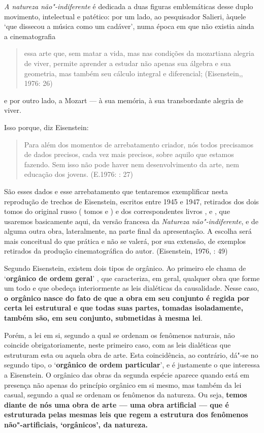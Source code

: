 \emph{A natureza não"-indiferente} é dedicada a duas figuras emblemáticas
desse duplo movimento, intelectual e patético: por um lado, ao
pesquisador Salieri, àquele `que dissecou a música como um cadáver',
numa época em que não existia ainda a cinematografia

\begin{quote}
essa arte que, sem matar a vida, mas nas condições da mozartiana alegria
de viver, permite aprender a estudar não apenas sua álgebra e sua
geometria, mas também seu cálculo integral e diferencial; (Eisenstein,,
1976: 26)
\end{quote}

e por outro lado, a Mozart --- à sua memória, à sua transbordante alegria
de viver.

Isso porque, diz Eisenstein:

\begin{quote}
Para além dos momentos de arrebatamento criador, nós todos precisamos de
dados precisos, cada vez mais precisos, sobre aquilo que estamos
fazendo. Sem isso não pode haver nem desenvolvimento da arte, nem
educação dos jovens. (E.1976: : 27)
\end{quote}

São esses dados e esse arrebatamento que tentaremos exemplificar nesta
reprodução de trechos de Eisenstein, escritos entre 1945 e 1947,
retirados dos dois tomos do original russo ( tomos  e ) e dos
correspondentes livros , e , que usaremos basicamente aqui, da versão
francesa da \emph{Natureza não"-indiferente}, e de alguma outra obra,
lateralmente, na parte final da apresentação. A escolha será mais
conceitual do que prática e não se valerá, por sua extensão, de exemplos
retirados da produção cinematográfica do autor. (Eisenstein, 1976, :
49)

Segundo Eisenstein, existem dois tipos de orgânico. Ao primeiro ele
chama de `\textbf{orgânico de ordem geral}' , que caracteriza, em geral,
qualquer obra que forme um todo e que obedeça interiormente as leis
dialéticas da causalidade. Nesse caso, \textbf{o orgânico nasce do fato
de que a obra em seu conjunto é regida por certa lei estrutural e que
todas suas partes, tomadas isoladamente, também são, em seu conjunto,
submetidas à mesma lei}.

Porém, a lei em si, segundo a qual se ordenam os fenômenos naturais, não
coincide obrigatoriamente, neste primeiro caso, com as leis dialéticas
que estruturam esta ou aquela obra de arte. Esta coincidência, ao
contrário, dá"-se no segundo tipo, o `\textbf{orgânico de ordem
particular}', e é justamente o que interessa a Eisenstein. O orgânico
das obras da segunda espécie aparece quando está em presença não apenas
do princípio orgânico em si mesmo, mas também da lei casual, segundo a
qual se ordenam os fenômenos da natureza. Ou seja, \textbf{temos diante
de nós uma obra de arte --- uma obra artificial --- que é estruturada
pelas mesmas leis que regem a estrutura dos fenômenos não"-artificiais,
`orgânicos', da natureza.}

